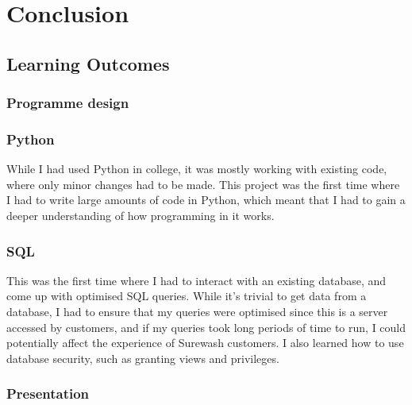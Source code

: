 
\section{Conclusion}
    \subsection{Learning Outcomes}
        \subsubsection{Programme design}
            \subsubsection{Python}
            While I had used Python in college, it was mostly working with existing code, where only minor changes had to be made. This project was the first time where I had to write large amounts of code in Python, which meant that I had to gain a deeper understanding of how programming in it works.
            \subsubsection{SQL}
            This was the first time where I had to interact with an existing database, and come up with optimised SQL queries. While it's trivial to get data from a database, I had to ensure that my queries were optimised since this is a server accessed by customers, and if my queries took long periods of time to run, I could potentially affect the experience of Surewash customers. I also learned how to use database security, such as granting views and privileges.
        \subsubsection{Presentation}
